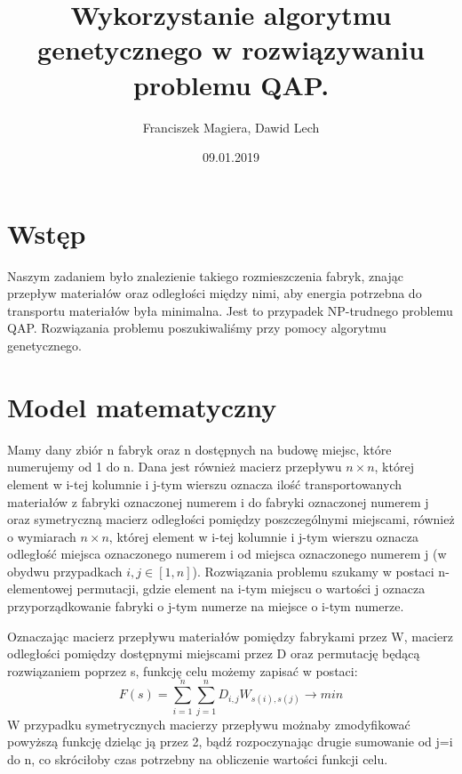 \documentclass[12pt]{article}
\author{Franciszek Magiera, Dawid Lech}
\title{Wykorzystanie algorytmu genetycznego w rozwiązywaniu problemu QAP.}
\date{09.01.2019}
\begin{document}
\sloppy
\maketitle
\newpage
\tableofcontents
\newpage
\section{Wstęp}
Naszym zadaniem było znalezienie takiego rozmieszczenia fabryk, znając przepływ materiałów oraz odległości między nimi, aby energia potrzebna do transportu materiałów była minimalna. Jest to przypadek NP-trudnego problemu QAP. Rozwiązania problemu poszukiwaliśmy przy pomocy algorytmu genetycznego.
\section{Model matematyczny}
Mamy dany zbiór n fabryk oraz n dostępnych na budowę miejsc, które numerujemy od 1 do n. Dana jest również macierz przepływu $n\times n$, której element w i-tej kolumnie i j-tym wierszu oznacza ilość transportowanych materiałów z fabryki oznaczonej numerem i do fabryki oznaczonej numerem j oraz symetryczną macierz odległości pomiędzy poszczególnymi miejscami, również o wymiarach $n\times n$, której element w i-tej kolumnie i j-tym wierszu oznacza odległość miejsca oznaczonego numerem i od miejsca oznaczonego numerem j (w obydwu przypadkach $i,j \in [1,n]$). Rozwiązania problemu szukamy w postaci n-elementowej permutacji, gdzie element na i-tym miejscu o wartości j oznacza przyporządkowanie fabryki o j-tym numerze na miejsce o i-tym numerze.
\par
Oznaczając macierz przepływu materiałów pomiędzy fabrykami przez W, macierz odległości pomiędzy dostępnymi miejscami przez D oraz permutację będącą rozwiązaniem poprzez s, funkcję celu możemy zapisać w postaci:
\begin{equation}
F(s) = \sum_{i=1}^{n}  \sum_{j=1}^{n}D_{i,j}W_{s(i), s(j)} \longrightarrow min \label{Funkcja celu}
\end{equation}
W przypadku symetrycznych macierzy przepływu możnaby zmodyfikować powyższą funkcję dzieląc ją przez 2, bądź rozpoczynając drugie sumowanie od j=i do n, co skróciłoby czas potrzebny na obliczenie wartości funkcji celu.
\end{document}
